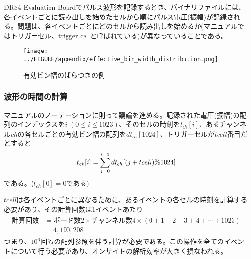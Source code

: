 \documentclass[../../main.tex]{subfiles}
\numberwithin{equation}{section}
\numberwithin{table}{section}
\numberwithin{figure}{section}
\begin{document}
      DRS4 Evaluation Boardでパルス波形を記録するとき、バイナリファイルには、各イベントごとに読み出しを始めたセルから順にパルス電圧(振幅)が記録される。問題は、各イベントごとにどのセルから読み出しを始めるか(マニュアル\cite{preparation:DRS4_manual}ではトリガーセル、trigger cellと呼ばれている)が異なっていることである。

      \begin{figure}[tbp]
        \centering
        \texttt{[image: ../FIGURE/appendix/effective\_bin\_width\_distribution.png]}
        \caption{有効ビン幅のばらつきの例}
        \label{fig:appendix_effective_bin_width_distribution}
      \end{figure}
    
    \subsubsection{波形の時間の計算}
      マニュアル\cite{preparation:DRS4_manual}のノーテーションに則って議論を進める。記録された電圧(振幅)の配列のインデックスを$i$ $(0\leq i \leq 1023)$、そのセルの時刻を$t_{ch}[i]$、あるチャンネル$ch$の各セルごとの有効ビン幅の配列を$dt_{ch}[1024]$、トリガーセルが$tcell$番目だとすると
      \begin{align}
        t_{ch}[i]=\sum_{j=0}^{i-1}dt_{ch}\qty[(j+tcell)\%1024]\label{eq:appendix_t_ch}
      \end{align}
      である。($t_{ch}[0]=0$である)

      $tcell$は各イベントごとに異なるために、あるイベントの各セルの時刻を計算する必要があり、その計算回数は1イベントあたり
      \begin{align}
        \begin{split}
          \text{計算回数}&=\text{ボード数2}\times\text{チャンネル数4}\times(0+1+2+3+4+\cdots +1023)\\
        &=4,190,208
      \end{split}
      \end{align}
      つまり、$10^6$回もの配列参照を伴う計算が必要である。この操作を全てのイベントについて行う必要があり、オンサイトの解析効率が大きく損なわれる。
\end{document}
